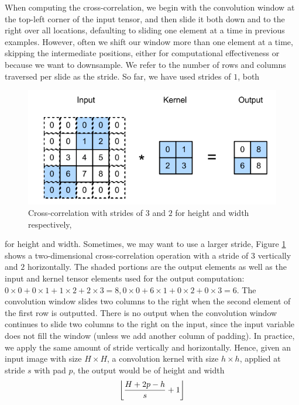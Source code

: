 \documentclass[12pt]{report}
\numberwithin{equation}{section}
\DeclarePairedDelimiter\floor{\lfloor}{\rfloor}
\begin{document}
When computing the cross-correlation, we begin with the convolution window at the top-left corner of the input tensor, and then slide it both down and to the right over all locations, defaulting to sliding one element at a time in previous examples. However, often we shift our window more than one element at a time, skipping the intermediate positions, either for computational effectiveness or because we want to downsample. We refer to the number of rows and columns traversed per slide as the stride. So far, we have used strides of $1$, both 
\begin{figure}[H]
\centering
\includegraphics[scale=0.9]{png/stride.png}
\caption[Cross-correlation with strides of $3$ and $2$ for height and width respectively]{Cross-correlation with strides of $3$ and $2$ for height and width respectively, \textbf{\cite{zhang2020dive}}}
\label{fig:stride}
\end{figure} \noindent
for height and width. Sometimes, we may want to use a larger stride, Figure \ref{fig:stride} shows a two-dimensional cross-correlation operation with a stride of $3$ vertically and $2$ horizontally. The shaded portions are the output elements as well as the input and kernel tensor elements used for the output computation: $0 \times 0 + 0 \times 1 + 1 \times 2 + 2 \times 3 = 8, 0 \times 0 + 6 \times 1 + 0 \times 2 + 0 \times 3 = 6$. The convolution window slides two columns to the right when the second element of the first row is outputted. There is no output when the convolution window continues to slide two columns to the right on the input, since the input variable does not fill the window (unless we add another column of padding). In practice, we apply the same amount of stride vertically and horizontally. Hence, given an input image with size $H \times H$, a convolution kernel with size $h \times h$, applied at stride $s$ with pad $p$, the output would be of height and width
\begin{equation}\label{eqn:pad_stride}
\floor*{\dfrac{H + 2p - h}{s} + 1}
\end{equation}
\end{document}
